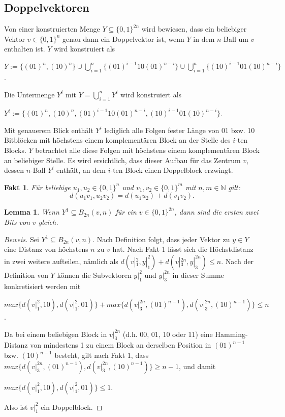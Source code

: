 \documentclass[11pt]{article}
\newtheorem{lemma}{Lemma}
\newtheorem{fakt}{Fakt}
\theoremstyle{break}
\theoremstyle{norm}
\begin{document}
\subsection{Doppelvektoren}
Von einer konstruierten Menge $Y \subseteq \{0,1\}^{2n}$ wird bewiesen, dass ein beliebiger Vektor $v \in \{0,1\}^n$ genau dann ein Doppelvektor ist, wenn $Y$ in dem $n$-Ball um $v$ enthalten ist. $Y$ wird konstruiert als 
\begin{center}
         $Y:= \{(01)^n, (10)^n\} \cup \bigcup_{i=1}^{n} \{(01)^{i-1}10(01)^{n-i}\}
    \cup\bigcup_{i=1}^{n} \{(10)^{i-1}01(10)^{n-i}\}$.
\end{center}
Die Untermenge $Y^i$ mit $Y = \bigcup_{i=1}^n Y^i$ wird konstruiert als
\begin{center}
       $Y^i := \{(01)^n, (10)^n,(01)^{i-1}10(01)^{n-i},(10)^{i-1}01(10)^{n-i}\}$.
\end{center}
Mit genauerem Blick enthält $Y^i$ lediglich alle Folgen fester Länge von 01 bzw. 10 Bitblöcken mit höchstens einem komplementären Block an der Stelle des $i$-ten Blocks.
$Y$ betrachtet alle diese Folgen mit höchstens einem komplementären Block an beliebiger Stelle. Es wird ersichtlich, dass dieser Aufbau für das Zentrum $v$, dessen $n$-Ball $Y^i$ enthält, an dem $i$-ten Block einen Doppelblock erzwingt.
\begin{fakt} Für beliebige \(u_1, u_2 \in \{0, 1\}^n\) und \(v_1, v_2 \in \{0, 1\}^m\) mit \(n, m \in \mathbb{N}\) gilt:
    \[
    d(u_1 v_1, u_2 v_2) = d(u_1 u_2) + d(v_1 v_2).
    \]
    \end{fakt}
\begin{lemma}
    Wenn $Y^1 \subseteq B_{2n}(v,n)$ für ein $v \in \{0,1\}^{2n}$, dann sind die ersten zwei Bits von $v$ gleich.
\end{lemma} 
\begin{proof}[Beweis]
Sei $Y^1 \subseteq B_{2n}(v, n)$. Nach Definition folgt, dass jeder Vektor zu $y\in Y$ eine Distanz von höchstens $n$ zu $v$ hat. Nach Fakt 1 lässt sich die Höchstdistanz in zwei weitere aufteilen, nämlich als $d(v|_1^2, y|_1^2) + d(v|_3^{2n}, y|_3^{2n}) \leq n$. Nach der Definition von $Y$ können die Subvektoren $y|_1^2$ und $y|_3^{2n}$ in dieser Summe konkretisiert werden mit
\begin{center}
$max\{d(v|_1^2,10),d(v|_1^2, 01)\} + 
max\{d(v|_3^{2n},(01)^{n-1}), d(v|_3^{2n},(10)^{n-1}) \}\leq n$.
\end{center}
Da bei einem beliebigen Block in $v|_3^{2n}$ (d.h. 00, 01, 10 oder 11) eine Hamming-Distanz von mindestens 1 zu einem Block an derselben Position in $(01)^{n-1}$ bzw. $(10)^{n-1}$ besteht, gilt nach Fakt 1, dass $max\{d(v|_3^{2n},(01)^{n-1}), d(v|_3^{2n},(10)^{n-1}) \}\geq n-1$, und damit 
\begin{center}
$ max\{d(v|_1^2,10), d(v|_1^2,01)\} \leq 1$.
\end{center}
Also ist $v|_1^2$ ein Doppelblock.
\end{proof}
\end{document}
